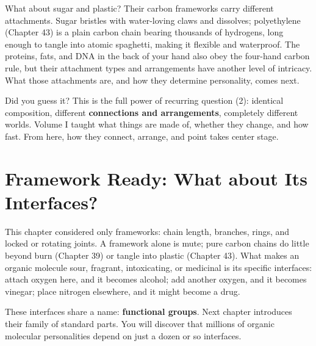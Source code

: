 What about sugar and plastic? Their carbon frameworks carry different attachments. Sugar bristles with water-loving claws and dissolves; polyethylene (Chapter 43) is a plain carbon chain bearing thousands of hydrogens, long enough to tangle into atomic spaghetti, making it flexible and waterproof. The proteins, fats, and DNA in the back of your hand also obey the four-hand carbon rule, but their attachment types and arrangements have another level of intricacy. What those attachments are, and how they determine personality, comes next.

Did you guess it? This is the full power of recurring question (2): identical composition, different \textbf{connections and arrangements}, completely different worlds. Volume I taught what things are made of, whether they change, and how fast. From here, how they connect, arrange, and point takes center stage.

\section{Framework Ready: What about Its Interfaces?}

This chapter considered only frameworks: chain length, branches, rings, and locked or rotating joints. A framework alone is mute; pure carbon chains do little beyond burn (Chapter 39) or tangle into plastic (Chapter 43). What makes an organic molecule sour, fragrant, intoxicating, or medicinal is its specific interfaces: attach oxygen here, and it becomes alcohol; add another oxygen, and it becomes vinegar; place nitrogen elsewhere, and it might become a drug.

These interfaces share a name: \textbf{functional groups}. Next chapter introduces their family of standard parts. You will discover that millions of organic molecular personalities depend on just a dozen or so interfaces.

